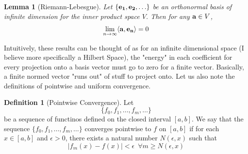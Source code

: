 \documentclass{report}
\newtheorem{lemma}[theorem]{Lemma}
\theoremstyle{definition}
\newtheorem{definition}[theorem]{Definition}
\theoremstyle{remark}
\begin{document}
\begin{lemma}[Riemann-Lebesgue]
    Let $\{\bold{e_1,e_2,}\ldots\}$ be an orthonormal basis of infinite dimension for the inner product space $V$. Then for any $\bold{a}\in V$, \label{lemma:rl}
    \begin{equation*}
        \lim_{n\rightarrow \infty}\langle\bold{a,e_n}\rangle = 0
    \end{equation*}
\end{lemma}
Intuitively, these results can be thought of as for an infinite dimensional space (I believe more specifically a Hilbert Space), the "energy" in each coefficient for every projection onto a basis vector must go to zero for a finite vector. Basically, a finite normed vector "runs out" of stuff to project onto. Let us also note the definitions of pointwise and uniform convergence.
\begin{definition}[Pointwise Convergence]
    Let \begin{equation*}
        \{f_0,f_1,\ldots,f_m,\ldots\}
    \end{equation*}
    be a sequence of functinos defined on the closed interval $[a,b]$. We say that the sequence $\{f_0,f_1,\ldots,f_m,\ldots\}$ converges pointwise to $f$ on $[a,b]$ if for each $x\in [a,b]$ and $\epsilon>0$, there exists a natural number $N(\epsilon,x)$ such that \begin{equation*}
        |f_m(x)-f(x)|<\epsilon \,\,\, \forall m \geq N(\epsilon,x)
    \end{equation*}
\end{definition}
\end{document}
